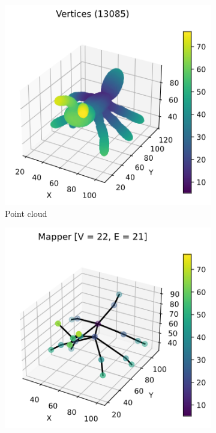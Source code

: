 \documentclass{article}
\begin{document}
\begin{figure}[ht]
    \centering
    \begin{subfigure}[c]{0.3\columnwidth}
        \centering
        \includegraphics[width=\textwidth]{ant-point-cloud}
        \caption{Point cloud}
        \label{fig:ant-points}
    \end{subfigure}
    \begin{subfigure}[c]{0.3\columnwidth}
        \centering
        \includegraphics[width=\textwidth]{ant-graph-3d}

\end{subfigure}
\end{figure}
\end{document}
